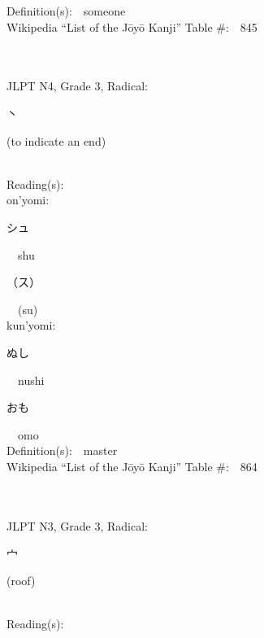 \begin{multicols}{2}
Definition(s):\ \ someone \\
Wikipedia ``List of the J\=oy\=o Kanji'' Table \#:\ \ 845 \\
\ \ \\
{\fontsize{34pt}{40pt}  }\ \ \\  %
{JLPT N4, Grade 3, Radical:\ \ {\begin{CJK}{UTF8}{min} 丶 \end{CJK}} (to indicate an end) } \\
Reading(s):\ \ \\
{\hspace*{1em}}on'yomi:\ \ \\
{\hspace*{2em}}{\begin{CJK}{UTF8}{min} シュ \end{CJK}}\ \ shu\ \ \\
{\hspace*{2em}}{\begin{CJK}{UTF8}{min} （ス） \end{CJK}}\ \ (su)\ \ \\
{\hspace*{1em}}kun'yomi:\ \ \\
{\hspace*{2em}}{\begin{CJK}{UTF8}{min} ぬし \end{CJK}}\ \ nushi\ \ \\
{\hspace*{2em}}{\begin{CJK}{UTF8}{min} おも \end{CJK}}\ \ omo\ \ \\
Definition(s):\ \ master \\
Wikipedia ``List of the J\=oy\=o Kanji'' Table \#:\ \ 864 \\
\ \ \\
{\fontsize{34pt}{40pt}  }\ \ \\  %
{JLPT N3, Grade 3, Radical:\ \ {\begin{CJK}{UTF8}{min} 宀 \end{CJK}} (roof) } \\
Reading(s):\ \ \\

\end{multicols}
